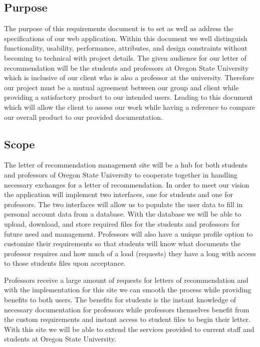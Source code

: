 \documentclass[onecolumn, draftclsnofoot,10pt, compsoc]{IEEEtran}
\begin{document}
\subsection{Purpose}
The purpose of this requirements document is to set as well as address the specifications of our web application. Within this document we well distinguish functionality, usability, performance, attributes, and design constraints without becoming to technical with project details. The given audience for our letter of recommendation will be the students and professors at Oregon State University which is inclusive of our client who is also a professor at the university. Therefore our project must be a mutual agreement between our group and client while providing a satisfactory product to our intended users. Leading to this document which will allow the client to assess our work while having a reference to compare our overall product to our provided documentation. 

\subsection{Scope}
The letter of recommendation management site will be a hub for both students and professors of Oregon State University to cooperate together in handling necessary exchanges for a letter of recommendation. In order to meet our vision the application will implement two interfaces, one for students and one for professors. The two interfaces will allow us to populate the user data to fill in personal account data from a database. With the database we will be able to upload, download, and store required files for the students and professors for future need and management. Professors will also have a unique profile option to customize their requirements so that students will know what documents the professor requires and how much of a load (requests) they have a long with access to those students files upon acceptance. 

Professors receive a large amount of requests for letters of recommendation and with the implementation for this site we can smooth the process while providing benefits to both users. The benefits for students is the instant knowledge of necessary documentation for professors while professors themselves benefit from the custom requirements and instant access to student files to begin their letter. With this site we will be able to extend the services provided to current staff and students at Oregon State University. 
\end{document}
